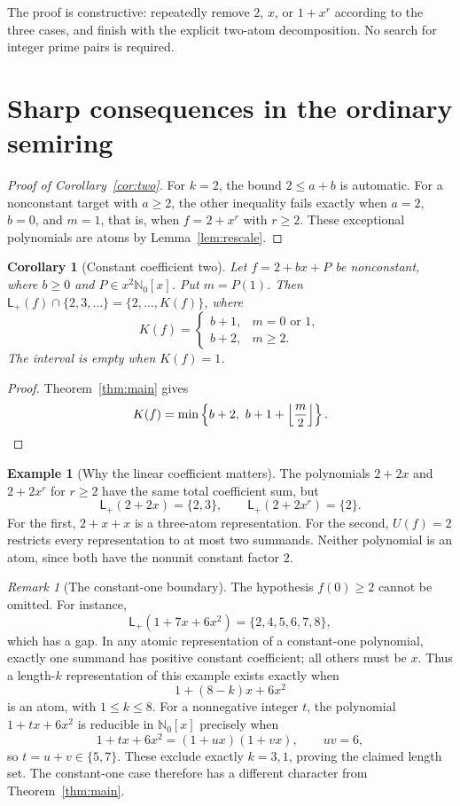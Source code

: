 \documentclass[11pt]{amsart}
\newcommand{\Nzero}{\mathbb N_0}
\newcommand{\Lplus}{\mathsf L_{+}}
\newtheorem{corollary}[theorem]{Corollary}
\theoremstyle{definition}
\newtheorem{example}[theorem]{Example}
\theoremstyle{remark}
\newtheorem{remark}[theorem]{Remark}
\begin{document}
The proof is constructive: repeatedly remove $2$, $x$, or $1+x^r$
according to the three cases, and finish with the explicit two-atom
decomposition. No search for integer prime pairs is required.

\section{Sharp consequences in the ordinary semiring}

\begin{proof}[Proof of Corollary~\ref{cor:two}]
For $k=2$, the bound $2\le a+b$ is automatic. For a nonconstant target
with $a\ge2$, the other inequality fails exactly when
$a=2$, $b=0$, and $m=1$, that is, when $f=2+x^r$ with $r\ge2$.
These exceptional polynomials are atoms by Lemma~\ref{lem:rescale}.
\end{proof}

\begin{corollary}[Constant coefficient two]\label{cor:constant-two}
Let $f=2+bx+P$ be nonconstant, where $b\ge0$ and $P\in x^2\Nzero[x]$.
Put $m=P(1)$. Then $\Lplus(f)\cap\{2,3,\ldots\}=\{2,\ldots,K(f)\}$,
where
\[
K(f)=
\begin{cases}
b+1,&m=0\text{ or }1,\\
b+2,&m\ge2.
\end{cases}
\]
The interval is empty when $K(f)=1$.
\end{corollary}

\begin{proof}
Theorem~\ref{thm:main} gives
\[
K(f)=\min\left\{b+2,\ b+1+\left\lfloor\frac m2\right\rfloor\right\}.
\qedhere
\]
\end{proof}

\begin{example}[Why the linear coefficient matters]\label{ex:linear}
The polynomials $2+2x$ and $2+2x^r$ for $r\ge2$ have the same total
coefficient sum, but
\[
\Lplus(2+2x)=\{2,3\},\qquad
\Lplus(2+2x^r)=\{2\}.
\]
For the first, $2+x+x$ is a three-atom representation. For the second,
$U(f)=2$ restricts every representation to at most two summands.
Neither polynomial is an atom, since both have the nonunit constant
factor $2$.
\end{example}

\begin{remark}[The constant-one boundary]\label{rem:constant-one}
The hypothesis $f(0)\ge2$ cannot be omitted. For instance,
\[
\Lplus(1+7x+6x^2)=\{2,4,5,6,7,8\},
\]
which has a gap. In any atomic representation of a constant-one
polynomial, exactly one summand has positive constant coefficient; all
others must be $x$. Thus a length-$k$ representation of this example
exists exactly when
\[
1+(8-k)x+6x^2
\]
is an atom, with $1\le k\le8$.
For a nonnegative integer $t$, the polynomial $1+tx+6x^2$ is reducible in
$\Nzero[x]$ precisely when
\[
1+tx+6x^2=(1+ux)(1+vx),\qquad uv=6,
\]
so $t=u+v\in\{5,7\}$. These exclude exactly $k=3,1$, proving the
claimed length set. The constant-one case therefore has a different
character from Theorem~\ref{thm:main}.
\end{remark}
\end{document}

